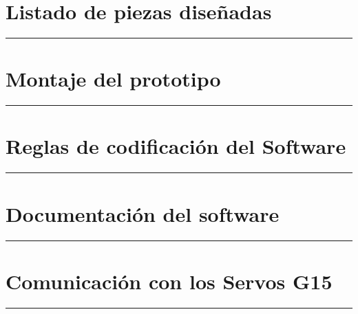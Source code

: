 \appendix
{}


     \chapter{Listado de piezas diseñadas} \label{app:listadoPiezas}
         \hrule
         \vspace{3mm}
     	 

     \chapter{Montaje del prototipo} \label{app:montajePiezas}
         \hrule
         \vspace{3mm}
         \begin{landscape}
         	
         \end{landscape}

     \chapter{Reglas de codificación del Software} \label{app:codificacionSW}
        \hrule
        \vspace{3mm}
     	

     \chapter{Documentación del software} \label{app:documentacion_software}
         \hrule
         \vspace{3mm}
     	 

     \chapter{Comunicación con los Servos G15} \label{app:registros_g15}
	     \hrule
	     \vspace{3mm}
	     

